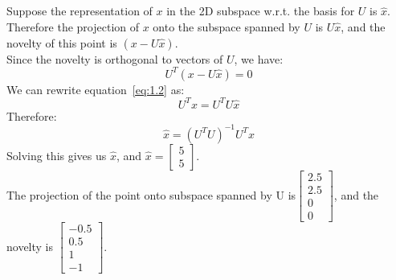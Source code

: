 \documentclass{article}
\begin{document}
\subsection{}
Suppose the representation of $x$ in the 2D subspace w.r.t. the basis for $U$ is $\hat{x}$. Therefore the projection of $x$ onto the subspace spanned by $U$ is $U\hat{x}$, and the novelty of this point is $(x-U\hat{x})$.\\
Since the novelty is orthogonal to vectors of $U$, we have:
\begin{equation}
\label{eq:1.2}
U^T(x-U\hat{x}) = 0
\end{equation}
We can rewrite equation~\ref{eq:1.2} as:
\begin{equation}
U^T x = U^T U \hat{x}
\end{equation}
Therefore:
\begin{equation}
\hat{x} = (U^TU)^{-1} U^T x
\end{equation}
Solving this gives us $\hat{x}$, and $
\hat{x} = 
\begin{bmatrix}
5 \\ 5
\end{bmatrix}$.\\
The projection of the point onto subspace spanned by U is$
\begin{bmatrix}
2.5 \\
2.5 \\
0 \\
0
\end{bmatrix}$,
and the novelty is $
\begin{bmatrix}
-0.5 \\
0.5 \\
1 \\
-1
\end{bmatrix}$.
\end{document}
